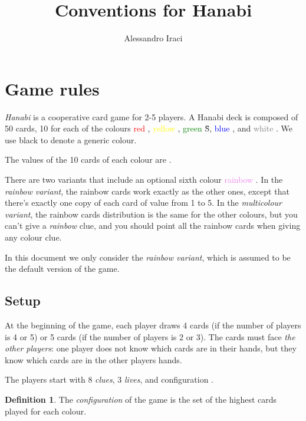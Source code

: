 \documentclass[a4paper]{article}
\title{Conventions for Hanabi}
\author{Alessandro Iraci}
\theoremstyle{plain}
\theoremstyle{definition}
\newtheorem{definition}[theorem]{Definition}
\begin{document}
	
\maketitle

\section{Game rules}

\textit{Hanabi} is a cooperative card game for 2-5 players. A Hanabi deck is composed of 50 cards, 10 for each of the colours \textcolor{red}{red} , \textcolor{yellow}{yellow} , \textcolor{green}{green} \G{S}, \textcolor{blue}{blue} , and \textcolor{gray}{white} . We use black to denote a generic colour.

The values of the 10 cards of each colour are          .

There are two variants that include an optional sixth colour \textcolor{violet}{rainbow} . In the \textit{rainbow variant}, the rainbow cards work exactly as the other ones, except that there's exactly one copy of each card of value from 1 to 5. In the \textit{multicolour variant}, the rainbow cards distribution is the same for the other colours, but you can't give a \textit{rainbow} clue, and you should point all the rainbow cards when giving any colour clue.

In this document we only consider the \textit{rainbow variant}, which is assumed to be the default version of the game.


\subsection{Setup}

At the beginning of the game, each player draws 4 cards (if the number of players is 4 or 5) or 5 cards (if the number of players is 2 or 3). The cards must face \textit{the other players}: one player does not know which cards are in their hands, but they know which cards are in the other players hands.

The players start with 8 \textit{clues}, 3 \textit{lives}, and configuration      .

\begin{definition}
	The \textit{configuration} of the game is the set of the highest cards played for each colour.
\end{definition}
\end{document}
